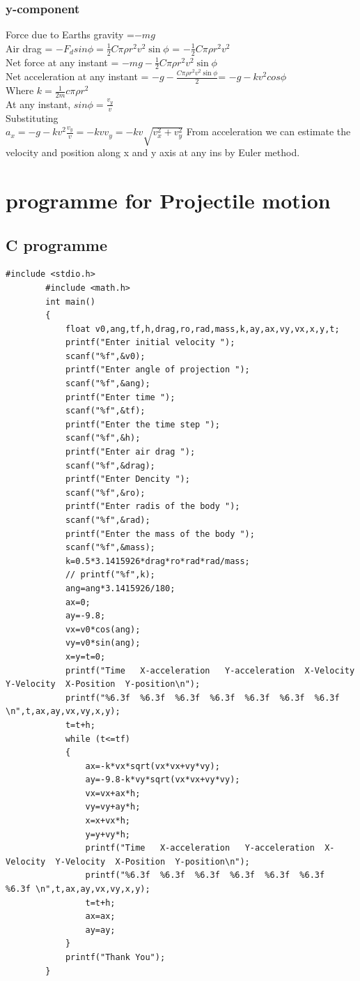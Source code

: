 \documentclass[12pt,a4paper]{article}
\begin{document}
		\subsubsection{y-component}
		Force due to Earths gravity =\(-mg\)\\
		Air drag = \(-F_d sin \phi = \frac{1}{2}C\pi \rho r^2 v^2 \sin \phi \) = \(-\frac{1}{2}C\pi \rho r^2 v^2 \)\\
		Net force at any instant = \(-mg-\frac{1}{2}C\pi \rho r^2 v^2 \sin \phi \)\\
		Net acceleration at any instant = \(-g-\frac{C\pi \rho r^2 v^2 \sin \phi }{2}\)= \(-g-kv^2 cos \phi \) \\
		Where \(k=\frac{1}{2m}c\pi \rho r^2\)\\
		At any instant, \(sin \phi = \frac{v_y}{v}\)\\
		Substituting \\
		\(a_x=-g-kv^2\frac{v_y}{v}=-kvv_y=-kv\sqrt{v_x^2+v_y^2}\)
	From acceleration we can estimate the velocity and position along x and y axis at any ins by Euler method.
	\section{programme for Projectile motion}
	\subsection{C programme}
	\begin{lstlisting}[style=CStyle]
		#include <stdio.h>
		#include <math.h>
		int main()
		{
			float v0,ang,tf,h,drag,ro,rad,mass,k,ay,ax,vy,vx,x,y,t;
			printf("Enter initial velocity ");
			scanf("%f",&v0);
			printf("Enter angle of projection ");
			scanf("%f",&ang);
			printf("Enter time ");
			scanf("%f",&tf);
			printf("Enter the time step ");
			scanf("%f",&h);
			printf("Enter air drag ");
			scanf("%f",&drag);
			printf("Enter Dencity ");
			scanf("%f",&ro);
			printf("Enter radis of the body ");
			scanf("%f",&rad);
			printf("Enter the mass of the body ");
			scanf("%f",&mass);
			k=0.5*3.1415926*drag*ro*rad*rad/mass;
			// printf("%f",k);
			ang=ang*3.1415926/180;
			ax=0;
			ay=-9.8;
			vx=v0*cos(ang);
			vy=v0*sin(ang);
			x=y=t=0;
			printf("Time   X-acceleration   Y-acceleration  X-Velocity  Y-Velocity  X-Position  Y-position\n");
			printf("%6.3f  %6.3f  %6.3f  %6.3f  %6.3f  %6.3f  %6.3f \n",t,ax,ay,vx,vy,x,y);
			t=t+h;
			while (t<=tf)
			{
				ax=-k*vx*sqrt(vx*vx+vy*vy);
				ay=-9.8-k*vy*sqrt(vx*vx+vy*vy);
				vx=vx+ax*h;
				vy=vy+ay*h;
				x=x+vx*h;
				y=y+vy*h;
				printf("Time   X-acceleration   Y-acceleration  X-Velocity  Y-Velocity  X-Position  Y-position\n");
				printf("%6.3f  %6.3f  %6.3f  %6.3f  %6.3f  %6.3f  %6.3f \n",t,ax,ay,vx,vy,x,y);
				t=t+h;
				ax=ax;
				ay=ay;
			}
			printf("Thank You"); 
		}
		
	\end{lstlisting}
\end{document}
